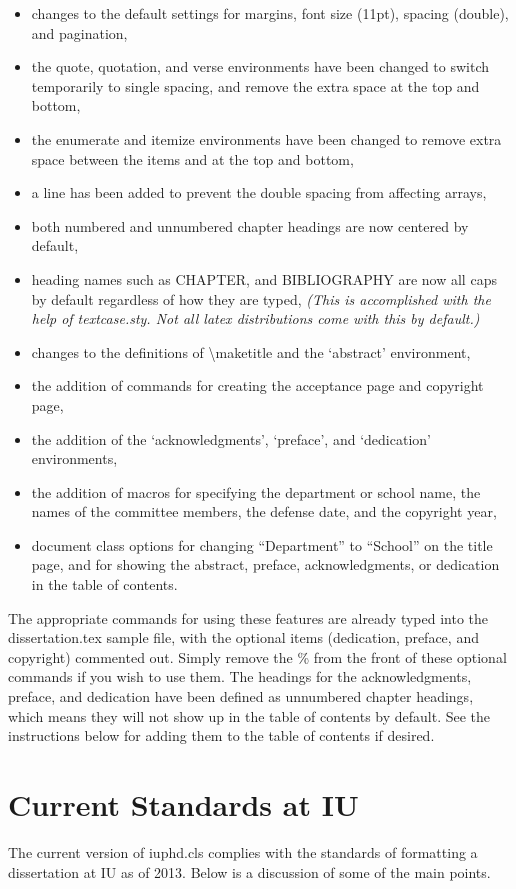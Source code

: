 \documentclass{iuphd}
\begin{document}
\begin{itemize}
 \item changes to the default settings for margins, font size (11pt), spacing (double), and pagination,
 \item the quote, quotation, and verse environments have been changed to switch temporarily to single spacing, and
       remove the extra space at the top and bottom,
 \item the enumerate and itemize environments have been changed to remove extra space between the items and at the
       top and bottom,
 \item a line has been added to prevent the double spacing from affecting arrays,
 \item both numbered and unnumbered chapter headings are now centered by default,
 \item heading names such as CHAPTER, and BIBLIOGRAPHY are now all caps by default regardless of how they are typed,
 \emph{(This is accomplished with the help of textcase.sty.  Not all latex distributions come with this by default.)}
 \item changes to the definitions of \textbackslash maketitle and the `abstract' environment,
 \item the addition of commands for creating the acceptance page and copyright page,
 \item the addition of the `acknowledgments', `preface', and `dedication' environments,
 \item the addition of macros for specifying the department or school name, the names of
 the committee members, the defense date, and the copyright year,
 \item document class options for changing ``Department'' to ``School'' on the title page, and for showing
 the abstract, preface, acknowledgments, or dedication in the table of contents.
\end{itemize}

The appropriate commands for using these features are already typed into the dissertation.tex sample file,
with the optional items (dedication, preface, and copyright) commented out.  Simply remove the \% from the front
of these optional commands if you wish to use them.  The headings for the acknowledgments, preface, and dedication have
been defined as unnumbered chapter headings, which means they will not show up in the table of contents by default.
See the instructions below for adding them to the table of contents if desired.

\section{Current Standards at IU}
The current version of iuphd.cls complies with the standards of formatting a dissertation at IU as of 2013.  Below is a discussion of
some of the main points.
\end{document}

